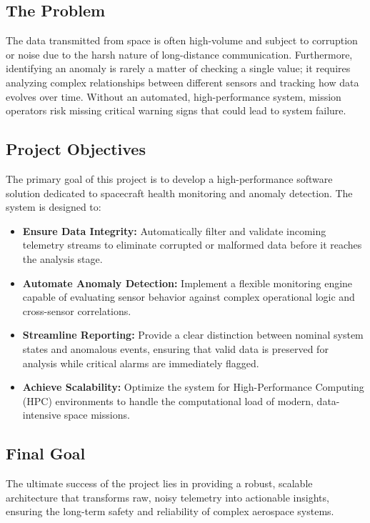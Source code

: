 \documentclass[11pt, a4paper]{article}
\begin{document}
\subsection*{The Problem}
The data transmitted from space is often high-volume and subject to corruption or noise due to the harsh nature of long-distance communication. Furthermore, identifying an anomaly is rarely a matter of checking a single value; it requires analyzing complex relationships between different sensors and tracking how data evolves over time. Without an automated, high-performance system, mission operators risk missing critical warning signs that could lead to system failure.

\subsection*{Project Objectives}
The primary goal of this project is to develop a high-performance software solution dedicated to spacecraft health monitoring and anomaly detection. The system is designed to:

\begin{itemize}
    \item \textbf{Ensure Data Integrity:} Automatically filter and validate incoming telemetry streams to eliminate corrupted or malformed data before it reaches the analysis stage.
    \item \textbf{Automate Anomaly Detection:} Implement a flexible monitoring engine capable of evaluating sensor behavior against complex operational logic and cross-sensor correlations.
    \item \textbf{Streamline Reporting:} Provide a clear distinction between nominal system states and anomalous events, ensuring that valid data is preserved for analysis while critical alarms are immediately flagged.
    \item \textbf{Achieve Scalability:} Optimize the system for High-Performance Computing (HPC) environments to handle the computational load of modern, data-intensive space missions.
\end{itemize}

\subsection*{Final Goal}
The ultimate success of the project lies in providing a robust, scalable architecture that transforms raw, noisy telemetry into actionable insights, ensuring the long-term safety and reliability of complex aerospace systems.
\end{document}
